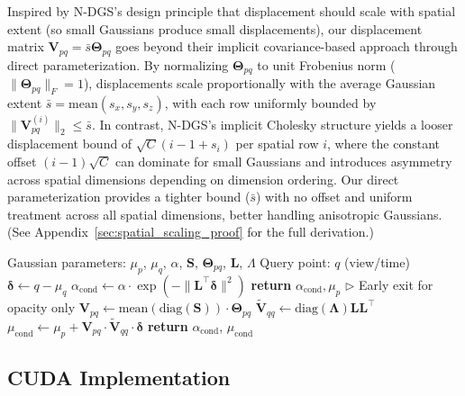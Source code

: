 \documentclass{article}
\newcommand{\return}{\textbf{return }}
\newcommand{\Comment}[1]{\hfill $\triangleright$ #1}
\theoremstyle{plain}
\theoremstyle{definition}
\theoremstyle{remark}
\begin{document}
Inspired by N-DGS's design principle that displacement should scale with spatial extent (so small Gaussians produce small displacements), our displacement matrix $\mathbf{V}_{pq} = \bar{s} \boldsymbol{\Theta}_{pq}$ goes beyond their implicit covariance-based approach through direct parameterization. By normalizing $\boldsymbol{\Theta}_{pq}$ to unit Frobenius norm ($\|\boldsymbol{\Theta}_{pq}\|_F = 1$), displacements scale proportionally with the average Gaussian extent $\bar{s} = \text{mean}(s_x, s_y, s_z)$, with each row uniformly bounded by $\|\mathbf{V}_{pq}^{(i)}\|_2 \leq \bar{s}$. In contrast, N-DGS's implicit Cholesky structure yields a looser displacement bound of $\sqrt{C}(i{-}1 + s_i)$ per spatial row $i$, where the constant offset $(i{-}1)\sqrt{C}$ can dominate for small Gaussians and introduces asymmetry across spatial dimensions depending on dimension ordering. Our direct parameterization provides a tighter bound ($\bar{s}$) with no offset and uniform treatment across all spatial dimensions, better handling anisotropic Gaussians. (See Appendix~\ref{sec:spatial_scaling_proof} for the full derivation.)


\begin{algorithm}[tb]
\caption{\textit{d}GS Conditional Gaussian Slicing}
\label{alg:slice}
\begin{algorithmic}[1]
\REQUIRE Gaussian parameters: $\mu_p$, $\mu_q$, $\alpha$, $\mathbf{S}$, $\boldsymbol{\Theta}_{pq}$, $\mathbf{L}$, $\Lambda$
\REQUIRE Query point: $q$ (view/time)
\STATE $\boldsymbol{\delta} \gets q - \mu_q$ %
\STATE $\alpha_{\text{cond}} \gets \alpha \cdot \exp(-\|\mathbf{L}^\top \boldsymbol{\delta}\|^2)$ %
    \STATE \return  $\alpha_{\text{cond}}, \mu_p$ \Comment{Early exit for opacity only}
\ENDIF
\STATE $\mathbf{V}_{pq} \gets \text{mean}(\text{diag}(\mathbf{S})) \cdot \boldsymbol{\Theta}_{pq}$ %
\STATE $\tilde{\mathbf{V}}_{qq} \gets \text{diag}(\boldsymbol{\Lambda}) \mathbf{L}\mathbf{L}^\top$ %
\STATE $\mu_{\text{cond}} \gets \mu_p + \mathbf{V}_{pq} \cdot \tilde{\mathbf{V}}_{qq} \cdot \boldsymbol{\delta}$ %
\STATE \return $\alpha_{\text{cond}}$, $\mu_{\text{cond}}$
\end{algorithmic}
\end{algorithm}
\setlength{\textfloatsep}{22pt}


\subsection{CUDA Implementation}
\end{document}
